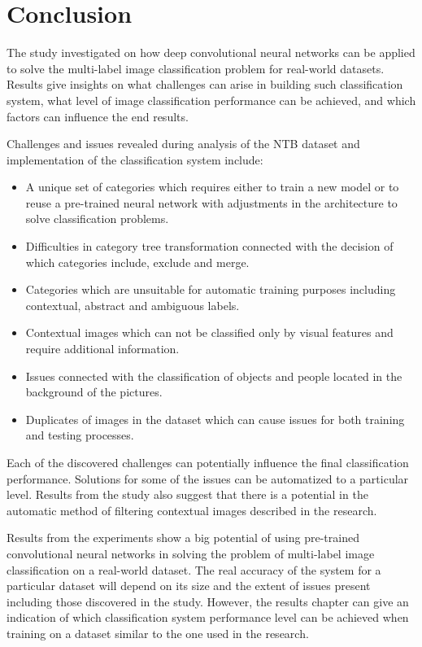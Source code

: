 \chapter{Conclusion}
\label{chap:conclusion}

The study investigated on how deep convolutional neural networks can be applied to solve the multi-label image classification problem for real-world datasets. Results give insights on what challenges can arise in building such classification system, what level of image classification performance can be achieved, and which factors can influence the end results.

Challenges and issues revealed during analysis of the NTB dataset and implementation of the classification system include:
\begin{itemize}
    \item A unique set of categories which requires either to train a new model or to reuse a pre-trained neural network with adjustments in the architecture to solve classification problems.
    \item Difficulties in category tree transformation connected with the decision of which categories include, exclude and merge.
    \item Categories which are unsuitable for automatic training purposes including contextual, abstract and ambiguous labels.
    \item Contextual images which can not be classified only by visual features and require additional information.
    \item Issues connected with the classification of objects and people located in the background of the pictures.
    \item Duplicates of images in the dataset which can cause issues for both training and testing processes.
\end{itemize}

Each of the discovered challenges can potentially influence the final classification performance. Solutions for some of the issues can be automatized to a particular level. Results from the study also suggest that there is a potential in the automatic method of filtering contextual images described in the research.

Results from the experiments show a big potential of using pre-trained convolutional neural networks in solving the problem of multi-label image classification on a real-world dataset. The real accuracy of the system for a particular dataset will depend on its size and the extent of issues present including those discovered in the study. However, the results chapter can give an indication of which classification system performance level can be achieved when training on a dataset similar to the one used in the research.

